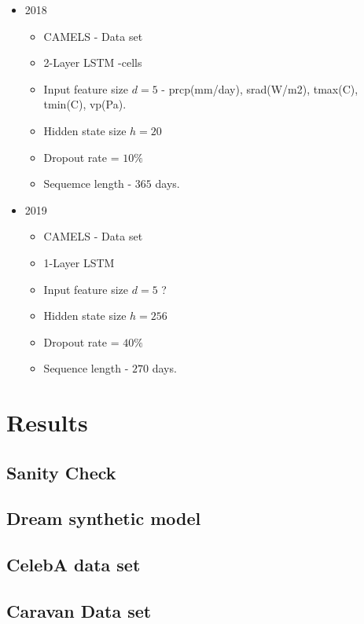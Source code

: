 \documentclass[12pt]{report}
\begin{document}
\begin{itemize}
	\item 2018
	\begin{itemize}
		\item CAMELS - Data set
		\item 2-Layer LSTM -cells
		\item Input feature size $d=5$ - prcp(mm/day), srad(W/m2), tmax(C), tmin(C), vp(Pa). 
		\item Hidden state  size $h=20$
		\item Dropout rate = $10\%$
		\item Sequemce length - $365$ days. 
	\end{itemize} 
	\item 2019
	\begin{itemize}
		\item CAMELS - Data set
		\item 1-Layer LSTM 
		\item Input feature size $d=5$ ? 
		\item Hidden state  size $h=256$
		\item Dropout rate = $40\%$
		\item Sequence length - $270$ days. 
	\end{itemize} 	
\end{itemize}

\newpage






\chapter{Results} 
 
\section{Sanity Check}

\section{Dream synthetic model}

\section{CelebA data set}

\section{Caravan Data set}
\end{document}
